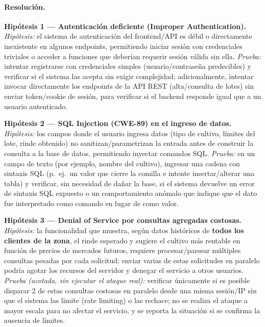 \paragraph{Resolución.}

\textbf{Hipótesis 1 --- Autenticación deficiente (Improper Authentication).}
\emph{Hipótesis:} el sistema de autenticación del frontend/API es débil o directamente
inexistente en algunos endpoints, permitiendo iniciar sesión con credenciales triviales o
acceder a funciones que deberían requerir sesión válida sin ella.
\emph{Prueba:} intentar registrarse con credenciales simples (usuario/contraseña
predecibles) y verificar si el sistema las acepta sin exigir complejidad; adicionalmente,
intentar invocar directamente los endpoints de la API REST (alta/consulta de lotes) sin
enviar token/cookie de sesión, para verificar si el backend responde igual que a un usuario
autenticado.

\textbf{Hipótesis 2 --- SQL Injection (CWE-89) en el ingreso de datos.}
\emph{Hipótesis:} los campos donde el usuario ingresa datos (tipo de cultivo, límites del
lote, rinde obtenido) no sanitizan/parametrizan la entrada antes de construir la consulta
a la base de datos, permitiendo inyectar comandos SQL.
\emph{Prueba:} en un campo de texto (por ejemplo, nombre del cultivo), ingresar una cadena
con sintaxis SQL (p.\ ej.\ un valor que cierre la comilla e intente insertar/alterar una
tabla) y verificar, sin necesidad de dañar la base, si el sistema devuelve un error de
sintaxis SQL expuesto o un comportamiento anómalo que indique que el dato fue interpretado
como comando en lugar de como valor.

\textbf{Hipótesis 3 --- Denial of Service por consultas agregadas costosas.}
\emph{Hipótesis:} la funcionalidad que muestra, según datos históricos de \textbf{todos los
clientes de la zona}, el rinde esperado y sugiere el cultivo más rentable en función de
precios de mercados futuros, requiere procesar/parsear múltiples consultas pesadas por cada
solicitud; enviar varias de estas solicitudes en paralelo podría agotar los recursos del
servidor y denegar el servicio a otros usuarios.
\emph{Prueba (acotada, sin ejecutar el ataque real):} verificar únicamente si es posible
disparar 2 de estas consultas costosas en paralelo desde una misma sesión/IP sin que el
sistema las limite (rate limiting) o las rechace; no se realiza el ataque a mayor escala
para no afectar el servicio, y se reporta la situación si se confirma la ausencia de
límites.

